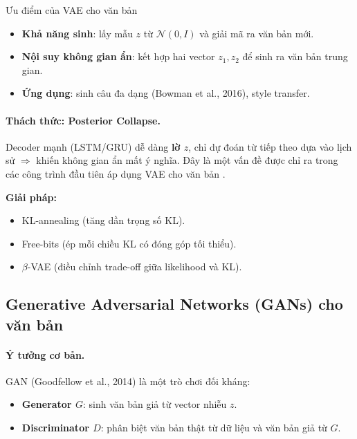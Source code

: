\begin{assess}{Ưu điểm của VAE cho văn bản}
\begin{itemize}
    \item \textbf{Khả năng sinh}: lấy mẫu $z$ từ $\mathcal{N}(0,I)$ và giải mã ra văn bản mới.
    \item \textbf{Nội suy không gian ẩn}: kết hợp hai vector $z_1, z_2$ để sinh ra văn bản trung gian.
    \item \textbf{Ứng dụng}: sinh câu đa dạng (Bowman et al., 2016), style transfer.
\end{itemize}
\end{assess}

\paragraph{Thách thức: Posterior Collapse.}  
Decoder mạnh (LSTM/GRU) dễ dàng \textbf{lờ $z$}, chỉ dự đoán từ tiếp theo dựa vào lịch sử $\Rightarrow$ khiến không gian ẩn mất ý nghĩa. Đây là một vấn đề được chỉ ra trong các công trình đầu tiên áp dụng VAE cho văn bản \cite{bowman2015generating}.

\textbf{Giải pháp:}
\begin{itemize}
    \item KL-annealing (tăng dần trọng số KL).  
    \item Free-bits (ép mỗi chiều KL có đóng góp tối thiểu).  
    \item $\beta$-VAE (điều chỉnh trade-off giữa likelihood và KL).  
\end{itemize}

\subsection{Generative Adversarial Networks (GANs) cho văn bản}
\label{ssec:gan_for_text}

\paragraph{Ý tưởng cơ bản.}  
GAN (Goodfellow et al., 2014) \cite{goodfellow2014generative} là một trò chơi đối kháng:
\begin{itemize}
    \item \textbf{Generator $G$}: sinh văn bản giả từ vector nhiễu $z$.  
    \item \textbf{Discriminator $D$}: phân biệt văn bản thật từ dữ liệu và văn bản giả từ $G$.  
\end{itemize}

